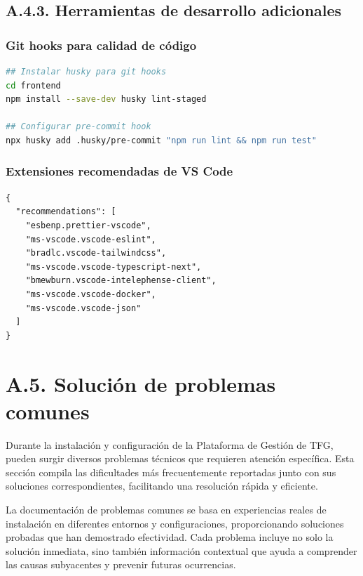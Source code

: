 \documentclass[12pt,a4paper,oneside]{report}
\begin{document}
\subsection{A.4.3. Herramientas de desarrollo
adicionales}\label{a.4.3.-herramientas-de-desarrollo-adicionales}

\subsubsection{Git hooks para calidad de
código}\label{git-hooks-para-calidad-de-cuxf3digo}

\begin{lstlisting}[language=bash]
## Instalar husky para git hooks
cd frontend
npm install --save-dev husky lint-staged

## Configurar pre-commit hook
npx husky add .husky/pre-commit "npm run lint && npm run test"
\end{lstlisting}

\subsubsection{Extensiones recomendadas de VS
Code}\label{extensiones-recomendadas-de-vs-code}

\begin{lstlisting}
{
  "recommendations": [
    "esbenp.prettier-vscode",
    "ms-vscode.vscode-eslint",
    "bradlc.vscode-tailwindcss",
    "ms-vscode.vscode-typescript-next",
    "bmewburn.vscode-intelephense-client",
    "ms-vscode.vscode-docker",
    "ms-vscode.vscode-json"
  ]
}
\end{lstlisting}

\section{A.5. Solución de problemas
comunes}\label{a.5.-soluciuxf3n-de-problemas-comunes}

Durante la instalación y configuración de la Plataforma de Gestión de TFG, pueden surgir diversos problemas técnicos que requieren atención específica. Esta sección compila las dificultades más frecuentemente reportadas junto con sus soluciones correspondientes, facilitando una resolución rápida y eficiente.

La documentación de problemas comunes se basa en experiencias reales de instalación en diferentes entornos y configuraciones, proporcionando soluciones probadas que han demostrado efectividad. Cada problema incluye no solo la solución inmediata, sino también información contextual que ayuda a comprender las causas subyacentes y prevenir futuras ocurrencias.
\end{document}
